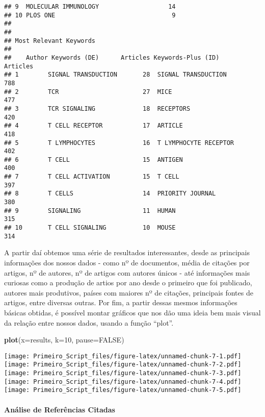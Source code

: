 \documentclass[]{article}
\newenvironment{Shaded}{\begin{snugshade}}{\end{snugshade}}
\newcommand{\DataTypeTok}[1]{\textcolor[rgb]{0.13,0.29,0.53}{#1}}
\newcommand{\DecValTok}[1]{\textcolor[rgb]{0.00,0.00,0.81}{#1}}
\newcommand{\KeywordTok}[1]{\textcolor[rgb]{0.13,0.29,0.53}{\textbf{#1}}}
\newcommand{\NormalTok}[1]{#1}
\newcommand{\OtherTok}[1]{\textcolor[rgb]{0.56,0.35,0.01}{#1}}
\let\oldparagraph\paragraph
\renewcommand{\paragraph}[1]{\oldparagraph{#1}\mbox{}}
\begin{document}
\begin{verbatim}
## 9  MOLECULAR IMMUNOLOGY                   14
## 10 PLOS ONE                                9
## 
## 
## Most Relevant Keywords
## 
##    Author Keywords (DE)      Articles Keywords-Plus (ID)     Articles
## 1        SIGNAL TRANSDUCTION       28  SIGNAL TRANSDUCTION        788
## 2        TCR                       27  MICE                       477
## 3        TCR SIGNALING             18  RECEPTORS                  420
## 4        T CELL RECEPTOR           17  ARTICLE                    418
## 5        T LYMPHOCYTES             16  T LYMPHOCYTE RECEPTOR      402
## 6        T CELL                    15  ANTIGEN                    400
## 7        T CELL ACTIVATION         15  T CELL                     397
## 8        T CELLS                   14  PRIORITY JOURNAL           380
## 9        SIGNALING                 11  HUMAN                      315
## 10       T CELL SIGNALING          10  MOUSE                      314
\end{verbatim}

A partir daí obtemos uma série de resultados interessantes, desde as
principais informações dos nossos dados - como nº de documentos, média
de citações por artigos, nº de autores, nº de artigos com autores únicos
- até informações mais curiosas como a produção de artios por ano desde
o primeiro que foi publicado, autores mais produtivos, países com
maiores nº de citações, principais fontes de artigos, entre diversas
outras. Por fim, a partir dessas mesmos informações básicas obtidas, é
possível montar gráficos que nos dão uma ideia bem mais visual da
relação entre nossos dados, usando a função ``plot''.

\begin{Shaded}
\begin{Highlighting}[]
\KeywordTok{plot}\NormalTok{(}\DataTypeTok{x=}\NormalTok{results, }\DataTypeTok{k=}\DecValTok{10}\NormalTok{, }\DataTypeTok{pause=}\OtherTok{FALSE}\NormalTok{)}
\end{Highlighting}
\end{Shaded}

\texttt{[image: Primeiro\_Script\_files/figure-latex/unnamed-chunk-7-1.pdf]}
\texttt{[image: Primeiro\_Script\_files/figure-latex/unnamed-chunk-7-2.pdf]}
\texttt{[image: Primeiro\_Script\_files/figure-latex/unnamed-chunk-7-3.pdf]}
\texttt{[image: Primeiro\_Script\_files/figure-latex/unnamed-chunk-7-4.pdf]}
\texttt{[image: Primeiro\_Script\_files/figure-latex/unnamed-chunk-7-5.pdf]}

\hypertarget{analise-de-referencias-citadas}{%
\paragraph{Análise de Referências
Citadas}\label{analise-de-referencias-citadas}}
\end{document}
